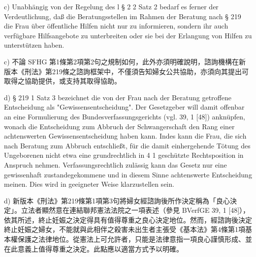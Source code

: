 \documentclass[12pt]{article}
\begin{document}
\begin{sourcepara}[title={原文E.184}]
c) Unabhängig von der Regelung des \abbrArt{} l § 2 \abbrAbs{} 2 Satz 2 \abbrSFHG{} bedarf es ferner der Verdeutlichung, daß die Beratungsstellen im Rahmen der Beratung nach § 219 \abbrStGB{} \abbrNF{} die Frau über öffentliche Hilfen nicht nur zu informieren, sondern ihr auch verfügbare Hilfsangebote zu unterbreiten oder sie bei der Erlangung von Hilfen zu unterstützen haben.
\end{sourcepara}
\begin{transpara}
c) 不論 SFHG 第1條第2項第2句之規制如何，此外亦須明確說明，諮詢機構在新版本《刑法》第219條之諮詢框架中，不僅須告知婦女公共協助，亦須向其提出可取得之協助提供，或支持其取得協助。
\end{transpara}

\begin{sourcepara}[title={原文E.185}]
d) § 219 \abbrAbs{} 1 Satz 3 \abbrStGB{} \abbrNF{} bezeichnet die von der Frau nach der Beratung getroffene Entscheidung als "Gewissensentscheidung". Der Gesetzgeber will damit offenbar an eine Formulierung des Bundesverfassungsgerichts (vgl. \abbrBVerfGE{} 39, 1 [48]) anknüpfen, wonach die Entscheidung zum Abbruch der Schwangerschaft den Rang einer achtenswerten Gewissensentscheidung haben kann. Indes kann die Frau, die sich nach Beratung zum Abbruch entschließt, für die damit einhergehende Tötung des Ungeborenen nicht etwa eine grundrechtlich in \abbrArt{} 4 \abbrAbs{} 1 \abbrGG{}\ggfnArtFourOneDE{} geschützte Rechtsposition in Anspruch nehmen. Verfassungsrechtlich zulässig kann das Gesetz nur eine gewissenhaft zustandegekommene und in diesem Sinne achtenswerte Entscheidung meinen. Dies wird in geeigneter Weise klarzustellen sein.
\end{sourcepara}
\begin{transpara}
d) 新版本《刑法》第219條第1項第3句將婦女經諮詢後所作決定稱為「良心決定」。立法者顯然意在連結聯邦憲法法院之一項表述（參見 BVerfGE 39, 1 [48]），依其所述，終止妊娠之決定得具有值得尊重之良心決定地位。然而，經諮詢後決定終止妊娠之婦女，不能就與此相伴之殺害未出生者主張受《基本法》第4條第1項\ggfnArtFourOneZH{}基本權保護之法律地位。從憲法上可允許者，只能是法律意指一項良心謹慎形成、並在此意義上值得尊重之決定。此點應以適當方式予以明確。
\end{transpara}

\end{document}
